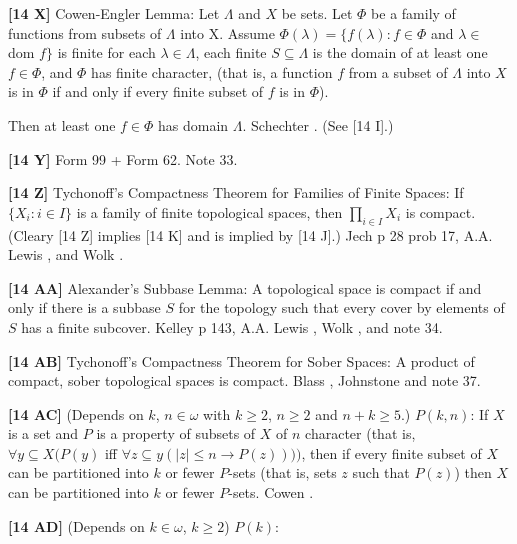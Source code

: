 \smallskip
\item{}{\bf [14 X]}  Cowen-Engler Lemma:  Let $\Lambda$ and $X$ be sets.
Let $\Phi$ be a family of functions from subsets of $\Lambda$ into X.
Assume
 $\Phi(\lambda) = \{f(\lambda ): f\in\Phi$ and $\lambda\in$
dom $f\}$ is finite for each $\lambda\in \Lambda$,
 each finite $S\subseteq\Lambda$ is the domain of at
least one $f\in\Phi$,  and
 $\Phi$ has finite character, (that is, a function $f$ from
a subset of $\Lambda$ into $X$ is in $\Phi$ if and only if every finite
subset of $f$ is in $\Phi$).
\item{}Then at least one $f\in\Phi$ has domain $\Lambda$. \ac{Schechter}
\cite{1996a}. (See [14 I].) 
\smallskip
\item{}{\bf [14 Y]}  Form 99  + Form 62. Note 33.
\smallskip
\item{}{\bf [14 Z]} Tychonoff's Compactness Theorem for Families of Finite
Spaces: If $\{ X_i:i\in I\}$ is a family of finite topological spaces, then
$\prod_{i\in I}X_i$ is compact.  (Cleary [14 Z] implies [14 K] and is
implied by [14 J].)  \ac{Jech} \cite{1973b} p 28 prob 17,
A.A. \ac{Lewis} \cite{1983}, and \ac{Wolk} \cite{1967}.
\smallskip
\item{}{\bf [14 AA]}  Alexander's Subbase Lemma: A topological space is
compact if and only if there is a subbase $S$ for  the  topology
such that every cover by elements of $S$ has a finite  subcover.
\ac{Kelley} \cite{1955} p 143, A.A. \ac{Lewis} \cite{1983}, \ac{Wolk}
\cite{1967}, and note 34. 
\smallskip
\item{}{\bf [14 AB]} Tychonoff's Compactness Theorem for Sober Spaces: A
product of compact, sober topological spaces is compact.
\ac{Blass} \cite{1986}, \ac{Johnstone} \cite{1984} and note 37.
\smallskip
\item{}{\bf [14 AC]} (Depends on $k$, $n\in\omega$ with $k\ge 2$, $n\ge 2$
and $n + k\ge 5$.) $P(k,n)$: If $X$ is a set and $P$ is a property of
subsets of $X$ of $n$ character (that is, $\forall y\subseteq X (P(y)$
iff $\forall z\subseteq y (|z|\le n\rightarrow P(z))))$, then if every
finite subset of $X$ can be  partitioned into $k$ or fewer $P$-sets
(that is, sets $z$ such that $P(z)$) then $X$ can be partitioned
into $k$ or fewer $P$-sets.  \ac{Cowen} \cite{1982}.
\smallskip
\item{}{\bf [14 AD]}  (Depends on $k\in\omega$, $k\ge 2$) $P(k)$:
